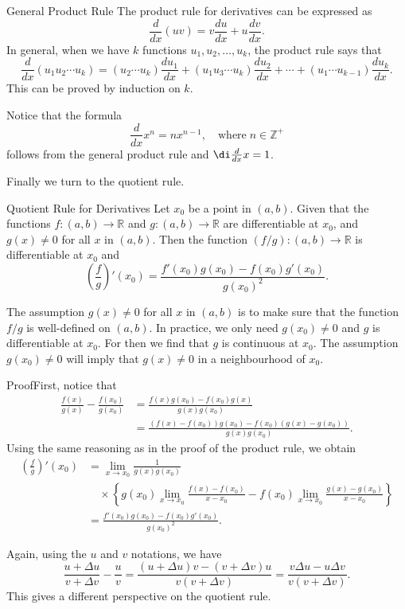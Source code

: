 \begin{highlight}{General Product Rule}
The product rule for derivatives can be expressed as
\[\frac{d}{dx}(uv)=v\frac{du}{dx}+u\frac{dv}{dx}.\] 
In general, when we have $k$ functions $u_1, u_2, \ldots, u_k$,
the product rule says that
\[\frac{d}{dx}(u_1u_2\cdots u_k)=(u_2\cdots u_k)\frac{d u_1}{dx}
+(u_1u_3\cdots u_k)\frac{du_2}{dx}+\cdots+(u_1\cdots u_{k-1})\frac{du_k}{dx}.\]
This can be proved by induction on $k$.
\end{highlight}
Notice that the formula
\[\frac{d}{dx}x^n=nx^{n-1}, \quad\text{where}\;n\in\mathbb{Z}^+ \] follows from the general product rule and $\di\frac{d}{dx}x=1$.

Finally we turn to the quotient rule.
\begin{proposition}[label=23021307]{Quotient Rule for Derivatives} 
Let $x_0$ be a point in $(a, b)$. Given that the functions $f:(a,b)\to \mathbb{R}$ and $g:(a,b)\to \mathbb{R}$ are differentiable at $x_0$, and $g(x)\neq 0$ for all $x$ in $(a,b) $. Then the function $(f/g):(a,b)\to\mathbb{R}$ is differentiable at $x_0$ and
\[\left(\frac{f}{g}\right)'(x_0)=\frac{f'(x_0)g(x_0)-f(x_0)g'(x_0)}{g (x_0)^2}.\]
\end{proposition}The assumption $g(x)\neq 0$ for all $x$ in $ (a,b)$ is to make sure that the function $f/g$ is well-defined on $(a,b)$. In practice, we only need $g(x_0)\neq 0$ and $g$ is differentiable at $x_0$. For  then we find that $g$ is continuous at $x_0$. The assumption $g(x_0)\neq 0$ will imply that $g(x)\neq 0$ in a neighbourhood of $x_0$.
\begin{myproof}{Proof}First, notice that
\begin{align*}
\frac{f(x)}{g(x)}-\frac{f(x_0)}{g(x_0)}&=\frac{f(x)g(x_0)-f(x_0)g(x)}{g(x)g(x_0)}\\&=\frac{(f(x)-f(x_0))g(x_0)-f(x_0)(g(x)-g(x_0))}{g(x)g(x_0)}.
\end{align*}Using the same reasoning as in the proof of the product rule, we obtain
\begin{align*}
 \left(\frac{f}{g}\right)'(x_0) &=\lim_{x\to x_0}\frac{1}{g(x)g(x_0)}\\&\quad \times\left\{g(x_0)\lim_{x\to x_0}\frac{f(x)-f(x_0)}{x-x_0}-f(x_0)\lim_{x\to x_0}\frac{g(x)-g(x_0)}{x-x_0}\right\}\\
&=\frac{f'(x_0)g(x_0)-f(x_0)g'(x_0)}{g (x_0)^2}.
\end{align*}
\end{myproof}
Again, using the $u$ and $v$ notations, we have
\[\frac{u+\Delta u}{v+\Delta v}-\frac{u}{v}=\frac{(u+\Delta u)v-(v+\Delta v)u}{v(v+\Delta v)}=\frac{v\Delta u-u\Delta v}{v(v+\Delta v)}.\] This gives a different perspective on the quotient rule.

